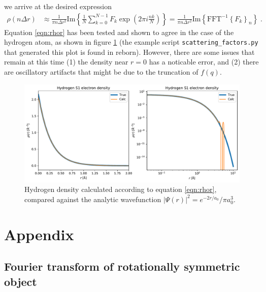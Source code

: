 \documentclass[11pt]{article}
\begin{document}
we arrive at the desired expression
\begin{align}\label{eqn:rhor}
\rho(n \Delta r) &\approx \frac{1}{\pi n \Delta r^2 } \text{Im} \left\{ \frac{1}{N}  \sum_{k=0}^{N-1}    F_k
\exp\left( 2\pi i \frac{nk}{ N} \right) \right\} = \frac{1}{\pi n \Delta r^2 } \text{Im}\left\{ \text{FFT}^{-1}
\left\{ F_k \right\}_n\right\} \; .
\end{align}
Equation \ref{eqn:rhor} has been tested and shown to agree in the case of the hydrogen atom, as shown in figure
\ref{fig:hydrogen} (the example script \texttt{scattering\_factors.py} that generated this plot is found in reborn).
However, there are some issues that remain at this time (1) the density near $r=0$ has a noticable error, and (2) there
are oscillatory artifacts that might be due to the truncation of $f(q)$.

\begin{figure}[htbp]
   \centering
   \includegraphics[width=\textwidth]{figures/hydrogen_density_1.pdf} 
   \caption{Hydrogen density calculated according to equation \ref{eqn:rhor}, compared against the analytic wavefunction
       $|\Psi(r)|^2=e^{-2 r/a_0}/\pi a_0^3$.}
   \label{fig:hydrogen}
\end{figure}

\section{Appendix}

\subsection{Fourier transform of rotationally symmetric object}
\label{sec:3d1d}
\end{document}
